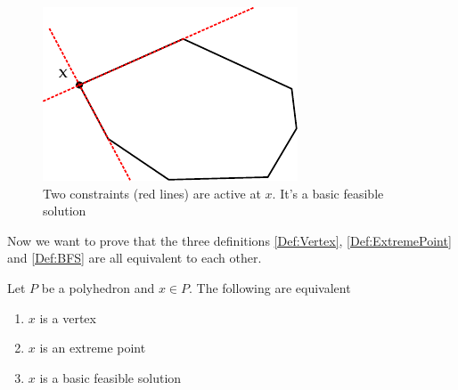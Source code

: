 \begin{figure}[hbt]
\begin{center}
\includegraphics{./images/bfs.pdf}
\end{center}
\caption{Two constraints (red lines) are active at $x$. It's a basic feasible solution}
\label{Fig:bfsActiveConstraints}
\end{figure}

Now we want to prove that the three definitions \ref{Def:Vertex}, \ref{Def:ExtremePoint} and \ref{Def:BFS} are all equivalent to each other.

\begin{thm} \label{Thm:cornerEquiv} Let $P$ be a polyhedron and $x\in P$. The following are equivalent
\begin{enumerate}
\item $x$ is a vertex
\item $x$ is an extreme point
\item $x$ is a basic feasible solution
\end{enumerate}
\end{thm}

